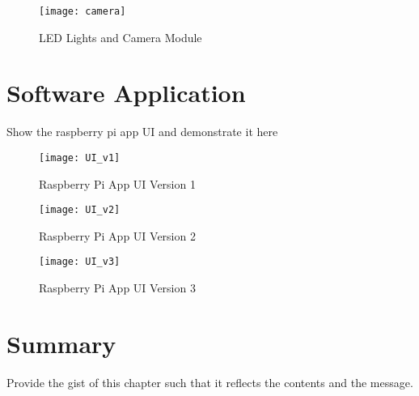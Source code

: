 \begin{figure}[!htbp]
	\centering
	\texttt{[image: camera]}
	\caption{LED Lights and Camera Module}
	\label{fig:camera_fig_results}
\end{figure}

\section{Software Application}

Show the raspberry pi app UI and demonstrate it here 

\begin{figure}[!htbp]
	\centering
	\texttt{[image: UI\_v1]}
	\caption{Raspberry Pi App UI Version 1}
	\label{fig:app_v1_fig}
\end{figure}

\begin{figure}[!htbp]
	\centering
	\texttt{[image: UI\_v2]}
	\caption{Raspberry Pi App UI Version 2}
	\label{fig:app_v2_fig}
\end{figure}

\begin{figure}[!htbp]
	\centering
	\texttt{[image: UI\_v3]}
	\caption{Raspberry Pi App UI Version 3}
	\label{fig:app_v3_fig}
\end{figure}

\section{Summary} \label{sec:summary_results_and_discussions}

Provide the gist of this chapter such that it reflects the contents and the message.